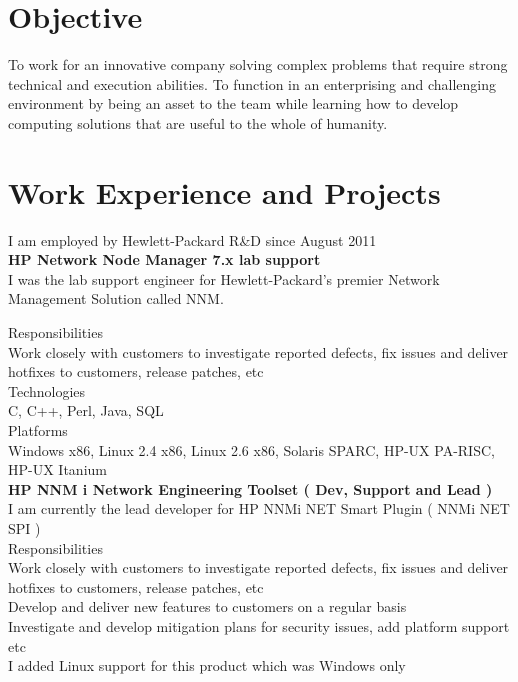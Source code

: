 \documentclass[line,margin]{res}
\begin{document}


\address{joji\_antony@gmx.com}
\address{+91 96323 41954}

\begin{resume}
\section{Objective}
To work for an innovative company solving complex problems that require strong technical and execution abilities. To function in an enterprising and challenging environment by being an asset to the team while learning how to develop computing solutions that are useful to the whole of humanity.\\

\section{Work Experience and Projects}

I am employed by Hewlett-Packard R\&D since August 2011\\

{\bf HP Network Node Manager 7.x lab support}\\
I was the lab support engineer for Hewlett-Packard's premier Network Management Solution called NNM.

Responsibilities\\
Work closely with customers to investigate reported defects, fix issues and deliver hotfixes to customers, release patches, etc\\

Technologies\\
C, C++, Perl, Java, SQL\\

Platforms\\
Windows x86, Linux 2.4 x86, Linux 2.6 x86, Solaris SPARC, HP-UX PA-RISC, HP-UX Itanium\\

{\bf HP NNM i Network Engineering Toolset ( Dev, Support and Lead )}\\
I am currently the lead developer for HP NNMi NET Smart Plugin ( NNMi NET SPI )\\

Responsibilities\\
Work closely with customers to investigate reported defects, fix issues and deliver hotfixes to customers, release patches, etc\\
Develop and deliver new features to customers on a regular basis\\
Investigate and develop mitigation plans for security issues, add platform support etc\\
I added Linux support for this product which was Windows only\\


\end{resume}
\end{document}
